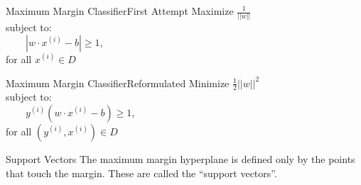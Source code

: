 \documentclass[xcolor=dvipsnames]{beamer}
\begin{document}
\begin{frame}{Maximum Margin Classifier}{First Attempt}
    \vspace{1em}
    Maximize $\frac{1}{||w||}$\\
    \vspace{2em}
    subject to:\\
    \vspace{1em}
        $ \qquad |w \cdotp x^{(i)} - b| \ge 1 $,\\
        \vspace{1em}
        \qquad \qquad for all $x^{(i)} \in D$\\
    \vspace{4em}
\end{frame}

\begin{frame}{Maximum Margin Classifier}{Reformulated}
    \vspace{1em}
    Minimize $\frac{1}{2}||w||^2$\\
    \vspace{2em}
    subject to:\\
    \vspace{1em}
        $ \qquad y^{(i)}(w \cdotp x^{(i)} - b) \ge 1 $,\\
        \vspace{1em}
        \qquad \qquad for all $(y^{(i)}, x^{(i)}) \in D$\\
    \vspace{4em}
\end{frame}

\begin{frame}{Support Vectors}
    The maximum margin hyperplane is defined only by the points that touch the margin. These are called the ``support vectors''.
\end{frame}
\end{document}
